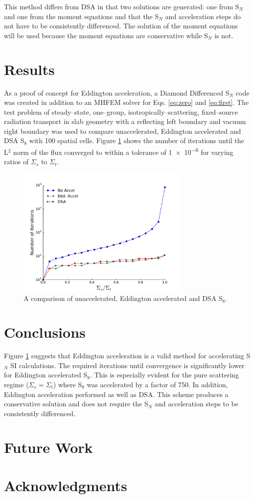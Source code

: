 \documentclass{anstrans}
\newcommand{\SN}{S$_N$\xspace}
\begin{document}
	This method differs from DSA in that two solutions are generated: one from \SN and one from the moment equations and that the \SN and acceleration steps do not have to be consistently differenced. The solution of the moment equations will be used because the moment equations are conservative while \SN is not. 
	
\section{Results}
	As a proof of concept for Eddington acceleration, a Diamond Differenced \SN code was created in addition to an MHFEM solver for Eqs. \ref{eq:zero} and \ref{eq:first}. The test problem of steady--state, one--group, isotropically--scattering, fixed--source radiation transport in slab geometry with a reflecting left boundary and vacuum right boundary was used to compare unaccelerated, Eddington accelerated and DSA S$_8$ with 100 spatial cells. Figure \ref{fig:comparison} shows the number of iterations until the L$^2$ norm of the flux converged to within a tolerance of \num{1e-6} for varying ratios of $\Sigma_s$ to $\Sigma_t$. 


	\begin{figure}[ht] %
	  \centering
	  \includegraphics[width=8.5cm]{accel.pdf}
	  \caption{A comparison of unaccelerated, Eddington accelerated and DSA S$_8$. }
	  \label{fig:comparison}
	\end{figure}

\section{Conclusions}
	Figure \ref{fig:comparison} suggests that Eddington acceleration is a valid method for accelerating \SN SI calculations. The required iterations until convergence is significantly lower for Eddington accelerated S$_8$. This is especially evident for the pure scattering regime ($\Sigma_s = \Sigma_t$) where S$_8$ was accelerated by a factor of 750. In addition, Eddington acceleration performed as well as DSA. This scheme produces a conservative solution and does not require the \SN and acceleration steps to be consistently differenced. 

\section{Future Work} 


\section{Acknowledgments}



\end{document}
